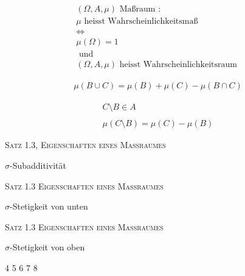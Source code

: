 \documentclass[a4paper]{article}
\begin{document}
{{		{
			\begin{gather*}
				(\Omega, A, \mu) \text{ Maßraum }: \\
				\mu \text{ heisst Wahrscheinlichkeitsmaß } \\
				\Leftrightarrow \\
				\mu (\Omega) = 1 \\
				\text{ und } \\
				(\Omega, A, \mu) \text{ heisst Wahrscheinlichkeitsraum }
			\end{gather*}
		}
		\newpage

		{
			\begin{gather*}
				\mu \left(
					B \cup C
					\right) = \mu (B) + \mu (C) - \mu \left(
					B \cap C
				\right) 
			\end{gather*}
		}
		\newpage

		{
			\begin{gather*}
				C \setminus B \in A \\
				\\
				\mu \left(
					C \setminus B
				\right) =
				\mu (C) - \mu (B)
			\end{gather*}
		}
		\newpage

	}

	{

		{
			{
				\noindent \textsc{Satz 1.3, Eigenschaften eines Maßraumes}
				\vfill
				\centerline{{\Large 
					$\sigma$-Subadditivität
				}}
				\vfill
			}
			\newpage
			{
				\noindent \textsc{Satz 1.3 Eigenschaften eines Maßraumes}
				\vfill
				\centerline{{\Large 
					$\sigma$-Stetigkeit von unten
				}}
				\vfill
			}
			
			\newpage
			{
				\noindent \textsc{Satz 1.3 Eigenschaften eines Maßraumes}
				\vfill
				\centerline{{\Large 
					$\sigma$-Stetigkeit von oben
				}}
				\vfill
			}
			\newpage
			4
			\newpage
			5
			\newpage
			6
			\newpage
			7
			\newpage
			8
			\newpage
		}

}}
\end{document}

